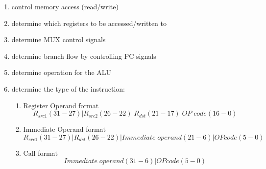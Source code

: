 \documentclass[10pt]{article}
\begin{document}
\begin{itemize}
\begin{enumerate}
        \item control memory access (read/write)
        \item determine which registers to be accessed/written to
        \item determine MUX control signals
        \item determine branch flow by controlling PC signals
        \item determine operation for the ALU
        \item determine the type of the instruction:
        \begin{enumerate}
            \item Register Operand format $$R_{src1}(31-27)|R_{src2}(26-22)|R_{dst}(21-17)|OP\; code(16-0)$$
            \item Immediate Operand format $$R_{src1}(31-27)|R_{dst}(26-22)|Immediate\; operand(21-6)|OP code(5-0)$$
            \item Call format $$Immediate\; operand(31-6)|OP code(5-0)$$
        \end{enumerate}
    \end{enumerate}
\end{itemize}
\newpage
\end{document}
